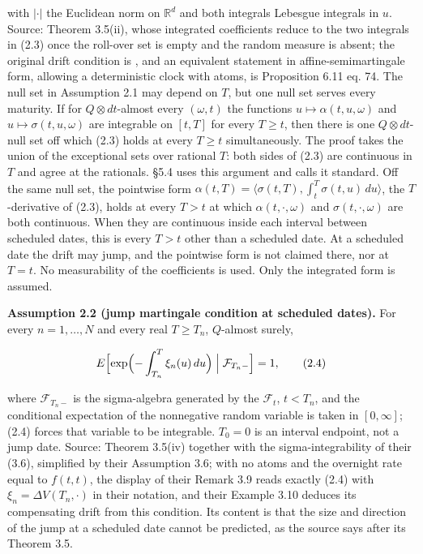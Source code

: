 \documentclass[11pt]{article}
\begin{document}
with \(|\cdot|\) the Euclidean norm on \(\mathbb R^d\) and both integrals Lebesgue integrals in \(u\). Source: \cite{fontana2022term} Theorem 3.5(ii), whose integrated coefficients reduce to the two integrals in (2.3) once the roll-over set is empty and the random measure is absent; the original drift condition is \cite{heath1992bond}, and an equivalent statement in affine-semimartingale form, allowing a deterministic clock with atoms, is \cite{kellerressel2018affine} Proposition 6.11 eq. 74. The null set in Assumption 2.1 may depend on \(T\), but one null set serves every maturity. If for \(Q \otimes dt\)-almost every \((\omega, t)\) the functions \(u \mapsto \alpha(t, u, \omega)\) and \(u \mapsto \sigma(t, u, \omega)\) are integrable on \([t, T]\) for every \(T \ge t\), then there is one \(Q \otimes dt\)-null set off which (2.3) holds at every \(T \ge t\) simultaneously. The proof takes the union of the exceptional sets over rational \(T\): both sides of (2.3) are continuous in \(T\) and agree at the rationals. \cite{filipovic2001consistency} §5.4 uses this argument and calls it standard. Off the same null set, the pointwise form \(\alpha(t, T) = \langle \sigma(t, T), \int_t^T \sigma(t, u)\,du \rangle\), the \(T\)-derivative of (2.3), holds at every \(T > t\) at which \(\alpha(t, \cdot, \omega)\) and \(\sigma(t, \cdot, \omega)\) are both continuous. When they are continuous inside each interval between scheduled dates, this is every \(T > t\) other than a scheduled date. At a scheduled date the drift may jump, and the pointwise form is not claimed there, nor at \(T = t\). No measurability of the coefficients is used. Only the integrated form is assumed.

\textbf{Assumption 2.2 (jump martingale condition at scheduled dates).} For every \(n = 1, \dots, N\) and every real \(T \ge T_n\), \(Q\)-almost surely,

\begin{equation*}
E\Bigl[ \exp\Bigl( -\int_{T_n}^T \xi_n(u)\,du \Bigr) \Bigm| \mathcal F_{T_n-} \Bigr] = 1, \tag{2.4}\label{eq:2.4}
\end{equation*}

where \(\mathcal F_{T_n-}\) is the sigma-algebra generated by the \(\mathcal F_t\), \(t < T_n\), and the conditional expectation of the nonnegative random variable is taken in \([0, \infty]\); (2.4) forces that variable to be integrable. \(T_0 = 0\) is an interval endpoint, not a jump date. Source: \cite{fontana2022term} Theorem 3.5(iv) together with the sigma-integrability of their (3.6), simplified by their Assumption 3.6; with no atoms and the overnight rate equal to \(f(t, t)\), the display of their Remark 3.9 reads exactly (2.4) with \(\xi_n = \Delta V(T_n, \cdot)\) in their notation, and their Example 3.10 deduces its compensating drift from this condition. Its content is that the size and direction of the jump at a scheduled date cannot be predicted, as the source says after its Theorem 3.5.
\end{document}
